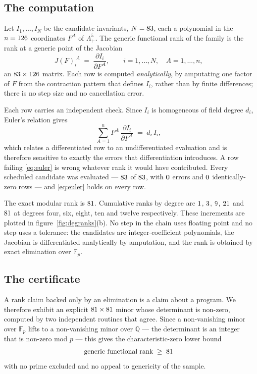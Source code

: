 \documentclass[11pt,a4paper]{article}
\theoremstyle{definition}
\theoremstyle{remark}
\newcommand{\Fp}{\mathbb{F}_p}
\newcommand{\Q}{\mathbb{Q}}
\begin{document}
\subsection{The computation}
Let $I_1,\dots,I_N$ be the candidate invariants, $N = 83$, each a
polynomial in the $n = 126$ coordinates $F^A$ of $\Lambda^5_+$.
The generic functional rank of the family is the rank at a generic point of the
Jacobian
\begin{equation}
J(F)^{\;A}_{i} \;=\; \frac{\partial I_i}{\partial F^A},
\qquad
i = 1,\dots,N,\quad A = 1,\dots,n,
\label{eq:jacobian}
\end{equation}
an $83 \times 126$ matrix. Each row is computed
\emph{analytically}, by amputating one factor of $F$ from the contraction
pattern that defines $I_i$, rather than by finite differences; there is no step
size and no cancellation error.

Each row carries an independent check. Since $I_i$ is homogeneous of field
degree $d_i$, Euler's relation gives
\begin{equation}
\sum_{A=1}^{n} F^{A}\,\frac{\partial I_i}{\partial F^{A}}
 \;=\; d_i\, I_i ,
\label{eq:euler}
\end{equation}
which relates a differentiated row to an undifferentiated evaluation and is
therefore sensitive to exactly the errors that differentiation introduces. A row
failing \eqref{eq:euler} is wrong whatever rank it would have contributed. Every
scheduled candidate was evaluated --- $83$ of
$83$, with $0$ errors and $0$
identically-zero rows --- and \eqref{eq:euler} holds on every row.

The exact modular rank is $81$. Cumulative ranks by degree are
$1$, $3$, $9$, $21$ and
$81$ at degrees four, six, eight, ten and twelve respectively.
These increments are plotted in figure~\ref{fig:degranks}(b). No step in the
chain uses floating point and no step uses a tolerance: the candidates are
integer-coefficient polynomials, the Jacobian is differentiated analytically by
amputation, and the rank is obtained by exact elimination over $\Fp$.

\subsection{The certificate}
A rank claim backed only by an elimination is a claim about a program. We
therefore exhibit an explicit $81 \times 81$ minor whose
determinant is non-zero, computed by two independent routines that agree. Since a
non-vanishing minor over $\Fp$ lifts to a non-vanishing minor over $\Q$ --- the
determinant is an integer that is non-zero mod $p$ --- this gives the
characteristic-zero lower bound
\begin{equation}
\text{generic functional rank} \;\ge\; 81
\end{equation}
with no prime excluded and no appeal to genericity of the sample.
\end{document}
